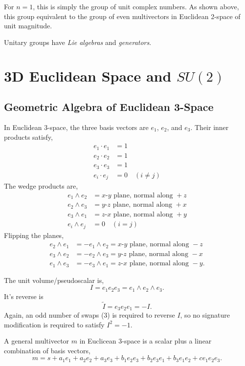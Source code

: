 	For $n = 1$, this is simply the group of unit complex numbers. As shown above, this group equivalent to the group of even multivectors in Euclidean 2-space of unit magnitude.
	
	Unitary groups have \emph{Lie algebras} and \emph{generators}.
	
	\section{3D Euclidean Space and $SU\left( 2\right) $}
	\subsection{Geometric Algebra of Euclidean 3-Space}
	In Euclidean 3-space, the three basis vectors are $e_1$, $e_2$, and $e_3$. Their inner products satisfy,	
	\begin{align*}
		e_1 \cdot e_1 & = 1\\
		e_2 \cdot e_2 & = 1\\
		e_3 \cdot e_3 & = 1\\		
		e_i \cdot e_j & = 0 \quad \left(i\neq j\right)
	\end{align*}	
	The wedge products are,	
	\begin{align*}		
		e_1 \wedge e_2 & = x\text{-}y\text{ plane, normal along }+z\\
		e_2 \wedge e_3 & = y\text{-}z\text{ plane, normal along }+x\\
		e_3 \wedge e_1 & = z\text{-}x\text{ plane, normal along }+y\\
		e_i \wedge e_j & = 0 \quad \left(i=j\right)
	\end{align*}
	Flipping the planes,
	\begin{align*}		
	e_2 \wedge e_1 & = -e_1 \wedge e_2 = x\text{-}y\text{ plane, normal along }-z\\
	e_3 \wedge e_2 & = -e_2 \wedge e_3 = y\text{-}z\text{ plane, normal along }-x\\
	e_1 \wedge e_3 & = -e_3 \wedge e_1 = z\text{-}x\text{ plane, normal along }-y.
	\end{align*}
	
	The unit volume/pseudoscalar is,
	\[
	I = e_1e_2e_3 = e_1 \wedge e_2 \wedge e_3.  
	\]
	It's reverse is
	\[
	\tilde{I} = e_3e_2e_1 = -I.
	\]
	Again, an odd number of swaps (3) is required to reverse $I$, so no signature modification is required to satisfy $I^2=-1.$
	
	A general multivector $m$ in Euclicean 3-space is a scalar plus a linear combination of basis vectors,
	\[
	m = s + a_1e_1 + a_2e_2 + a_3e_3 + b_1e_2e_3 + b_2e_3e_1 + b_3e_1e_2 + ce_1e_2e_3.
	\] 
